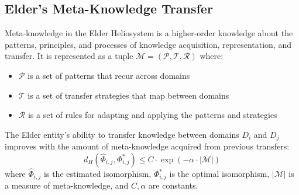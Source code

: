 \subsection{Elder's Meta-Knowledge Transfer}

\begin{definition}
Meta-knowledge in the Elder Heliosystem is a higher-order knowledge about the patterns, principles, and processes of knowledge acquisition, representation, and transfer. It is represented as a tuple $\mathcal{M} = (\mathcal{P}, \mathcal{T}, \mathcal{R})$ where:
\begin{itemize}
    \item $\mathcal{P}$ is a set of patterns that recur across domains
    \item $\mathcal{T}$ is a set of transfer strategies that map between domains
    \item $\mathcal{R}$ is a set of rules for adapting and applying the patterns and strategies
\end{itemize}
\end{definition}

\begin{theorem}
The Elder entity's ability to transfer knowledge between domains $D_i$ and $D_j$ improves with the amount of meta-knowledge acquired from previous transfers:
\begin{equation}
d_H(\hat{\Phi}_{i,j}, \Phi_{i,j}^*) \leq C \cdot \exp(-\alpha \cdot |\mathcal{M}|)
\end{equation}
where $\hat{\Phi}_{i,j}$ is the estimated isomorphism, $\Phi_{i,j}^*$ is the optimal isomorphism, $|\mathcal{M}|$ is a measure of meta-knowledge, and $C, \alpha$ are constants.
\end{theorem}

